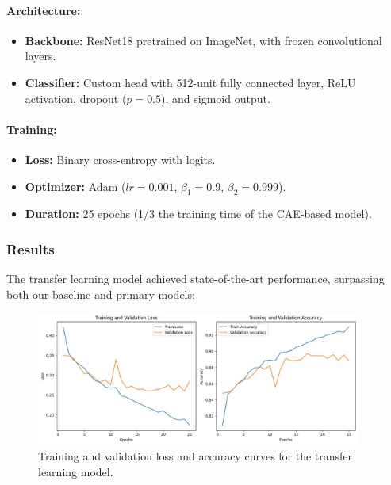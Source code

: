 \documentclass{article} %
\begin{document}
\paragraph{Architecture:}
\begin{itemize}
    \item \textbf{Backbone:} ResNet18 pretrained on ImageNet, with frozen convolutional layers.
    \item \textbf{Classifier:} Custom head with 512-unit fully connected layer, ReLU activation, dropout ($p=0.5$), and sigmoid output.
\end{itemize}

\paragraph{Training:}
\begin{itemize}
    \item \textbf{Loss:} Binary cross-entropy with logits.
    \item \textbf{Optimizer:} Adam ($lr=0.001$, $\beta_1=0.9$, $\beta_2=0.999$).
    \item \textbf{Duration:} 25 epochs (1/3 the training time of the CAE-based model).
\end{itemize}

\subsubsection{Results}
The transfer learning model achieved state-of-the-art performance, surpassing both our baseline and primary models:

\begin{figure}[h]
    \begin{center}
        \includegraphics[width=0.95\textwidth]{figs/transfer learning graphs.jpg}
    \end{center}
    \caption{Training and validation loss and accuracy curves for the transfer learning model.}
    \label{fig:transfer_curves}
\end{figure}
\end{document}
